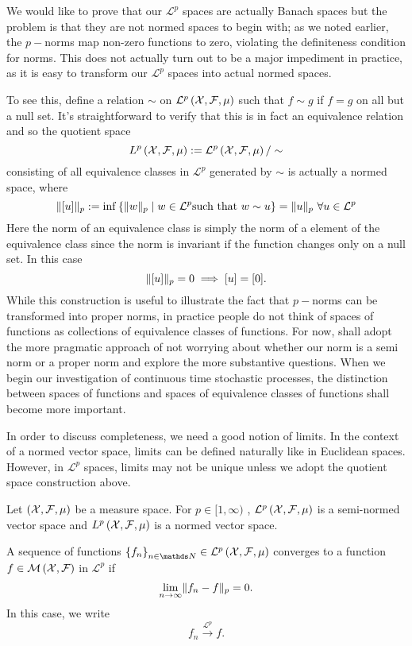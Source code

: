 We would like to prove that our $\mathcal{L}^{p}$ spaces are actually
Banach spaces but the problem is that they are not normed spaces to
begin with; as we noted earlier, the $p-$norms map non-zero functions
to zero, violating the definiteness condition for norms. This does
not actually turn out to be a major impediment in practice, as it
is easy to transform our $\mathcal{L}^{p}$ spaces into actual normed
spaces.

To see this, define a relation $\sim$ on $\mathcal{L}^{p}\left(\mathcal{X},\mathcal{F},\mu\right)$
such that $f\sim g$ if $f=g$ on all but a null set. It's straightforward
to verify that this is in fact an equivalence relation and so the
quotient space
\[
L^{p}\left(\mathcal{X},\mathcal{F},\mu\right):=\mathcal{L}^{p}\left(\mathcal{X},\mathcal{F},\mu\right)/\sim
\]
consisting of all equivalence classes in $\mathcal{L}^{p}$ generated
by $\sim$ is actually a normed space, where 
\[
\|[u]\|_{p}:=\inf\left\{ \lVert w\rVert_{p}\mid w\in\mathcal{L}^{p}\text{such that}\ w\sim u\right\} =\lVert u\rVert_{p}\ \forall u\in\mathcal{L}^{p}
\]
Here the norm of an equivalence class is simply the norm of a element
of the equivalence class since the norm is invariant if the function
changes only on a null set. In this case
\[
\lVert[u]\rVert_{p}=0\implies[u]=[0].
\]
While this construction is useful to illustrate the fact that $p-$norms
can be transformed into proper norms, in practice people do not think
of spaces of functions as collections of equivalence classes of functions.
For now, shall adopt the more pragmatic approach of not worrying about
whether our norm is a semi norm or a proper norm and explore the more
substantive questions. When we begin our investigation of continuous
time stochastic processes, the distinction between spaces of functions
and spaces of equivalence classes of functions shall become more important.

In order to discuss completeness, we need a good notion of limits.
In the context of a normed vector space, limits can be defined naturally
like in Euclidean spaces. However, in $\mathcal{L}^{p}$ spaces, limits
may not be unique unless we adopt the quotient space construction
above.
\begin{thm}
\label{thm:LpNormedVectorSpace}Let $\left(\mathcal{X},\mathcal{F},\mu\right)$ be a measure
space. For $p\in[1,\infty)$ , $\mathcal{L}^{p}\left(\mathcal{X},\mathcal{F},\mu\right)$ is a semi-normed
vector space and $L^{p}\left(\mathcal{X},\mathcal{F},\mu\right)$ is a normed vector space.
\end{thm}

\begin{defn}
\label{def:convergenceLp}A sequence of functions $\left\{ f_{n}\right\} _{n\in\N}\in\mathcal{L}^{p}\left(\X,\F,\mu\right)$
converges to a function $f\in\mathcal{M}\left(\mathcal{X},\mathcal{F}\right)$ in $\mathcal{L}^{p}$
if 
\[
\lim_{n\to\infty}\lVert f_{n}-f\rVert_{p}=0.
\]
In this case, we write
\[
f_{n}\stackrel{\mathcal{L}^{p}}{\longrightarrow}f.
\]
\end{defn}

